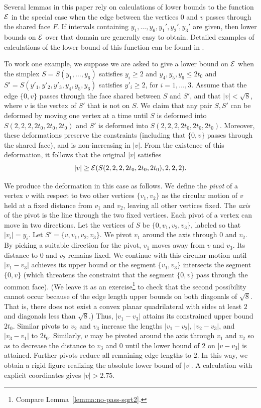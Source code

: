 Several lemmas in this paper rely on calculations of lower bounds
to the function ${\mathcal E}$ in the special case when the edge between
the vertices $0$ and $v$ passes through the shared face $F$. If
intervals containing $y_1,\ldots,y_6,y_1',y_2',y_3'$ are given,
then lower bounds on ${\mathcal E}$ over that domain are generally easy
to obtain.  Detailed examples of calculations of the lower bound
of this function can be found in \cite[Sec. 4]{part1}.

To work one example, we suppose we are asked to give a lower bound
on ${\mathcal E}$ when the simplex $S=S(y_1,\ldots,y_6)$ satisfies
$y_i\ge2$ and $y_4,y_5,y_6\le 2t_0$ and
$S'=S(y'_1,y'_2,y'_3,y_4,y_5,y_6)$ satisfies $y'_i\ge2$, for
$i=1,\ldots,3$. Assume that the edge $\{0,v\}$ passes through the
face shared between $S$ and $S'$, and that $|v|<\sqrt8$, where $v$
is the vertex of $S'$ that is not on $S$.  We claim that any pair
$S,S'$ can be deformed by moving one vertex at a time until $S$ is
deformed into $S(2,2,2,2t_0,2t_0,2t_0)$ and $S'$ is deformed into
$S(2,2,2,2t_0,2t_0,2t_0)$.  Moreover, these deformations preserve
the constraints (including that $\{0,v\}$ passes through the shared
face), and is non-increasing in $|v|$.  From the existence of this
deformation, it follows that the original $|v|$ satisfies
   $$|v| \ge {\mathcal E}(S(2,2,2,2t_0,2t_0,2t_0),2,2,2).$$

We produce the deformation in this case as follows. We define the
{\it pivot\/} of a vertex $v$ with respect to two other vertices
$\{v_1,v_2\}$ as the circular motion of $v$ held at a fixed
distance from $v_1$ and $v_2$, leaving all other vertices fixed.
The {\it axis\/} of the  pivot is the
line through the two fixed vertices. Each pivot of a vertex can
move in two directions.  Let the vertices of $S$ be
$\{0,v_1,v_2,v_3\}$, labeled so that $|v_i|=y_i$.  Let
$S'=\{v,v_1,v_2,v_3\}$.  We pivot $v_1$ around the axis through
$0$ and $v_2$. By picking a suitable direction for the pivot,
$v_1$ moves away from $v$ and $v_3$. Its distance to $0$ and $v_2$
remains fixed. We continue with this circular motion until
$|v_1-v_3|$ achieves its upper bound or the segment $\{v_1,v_3\}$
intersects the segment $\{0,v\}$ (which threatens the constraint
that the segment $\{0,v\}$ pass through the common face).  (We
leave it as an exercise\footnote{Compare
Lemma~\ref{lemma:no-pass-sqrt2}.} to check that the second
possibility cannot occur because of the edge length upper bounds
on both diagonals of $\sqrt8$.  That is, there does not exist a
convex planar quadrilateral with sides at least $2$ and diagonals
less than $\sqrt8$.) Thus, $|v_1-v_3|$ attains its constrained
upper bound $2t_0$. Similar pivots to $v_2$ and $v_3$ increase the
lengths $|v_1-v_2|$, $|v_2-v_3|$, and $|v_3-v_1|$ to $2t_0$.
Similarly, $v$ may be pivoted around the axis through $v_1$ and
$v_2$ so as to decrease the distance to $v_3$ and $0$ until the
lower bound of $2$ on $|v-v_3|$ is attained.  Further pivots
reduce all remaining edge lengths to $2$.   In this way, we obtain
a rigid figure realizing the absolute lower bound of $|v|$.  A
calculation with explicit coordinates gives $|v|>2.75$.

